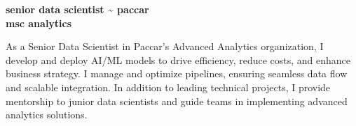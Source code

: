 \documentclass[12pt,a4paper]{moderncv}
\begin{document}
\vspace*{-4\baselineskip}
\makecvtitle
\vspace{-1.5\baselineskip}

\begin{flushright}
\textbf{\large senior data scientist \textasciitilde{} paccar} \\
\textbf{\large msc analytics} \\
\end{flushright}


As a Senior Data Scientist in Paccar’s Advanced Analytics organization, I develop and deploy AI/ML models to drive efficiency, reduce costs, and enhance business strategy. I manage and optimize pipelines, ensuring seamless data flow and scalable integration. In addition to leading technical projects, I provide mentorship to junior data scientists and guide teams in implementing advanced analytics solutions.
\\
\end{document}
